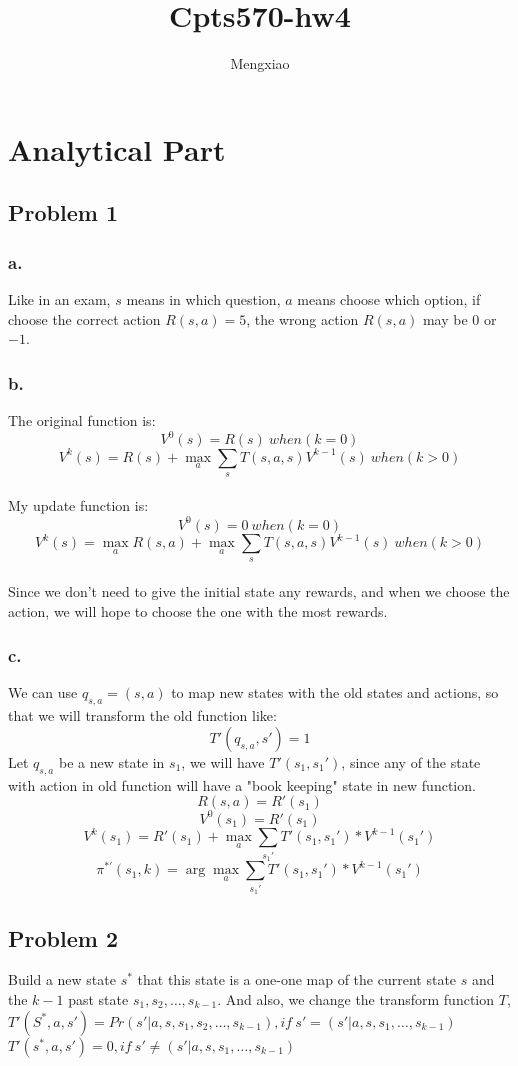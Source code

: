 \documentclass[12pt]{article}
\author{Mengxiao}
\title{Cpts570-hw4}
\begin{document}
	\maketitle
	\pagebreak
	\section{Analytical Part}
		\subsection{Problem 1}
            \subsubsection{a.}
                Like in an exam, $s$ means in which question, $a$ means choose which option,
                if choose the correct action $R(s,a)=5$, the wrong action $R(s,a)$ may be $0$ or $-1$.
            \subsubsection{b.}
                The original function is:
                    $$V^0(s)=R(s)\ when(k=0)$$
                    $$V^k(s)=R(s)+\max_a\sum_sT(s,a,s)V^{k-1}(s)\ when(k>0)$$\\
                My update function is:
                    $$V^0(s)=0\ when(k=0)$$
                    $$V^k(s)=\max_aR(s,a)+\max_a\sum_sT(s,a,s)V^{k-1}(s)\ when (k>0)$$\\
                Since we don't need to give the initial state any rewards, and when we choose the
                action, we will hope to choose the one with the most rewards.
            \subsubsection{c.}
                We can use $q_{s,a}=(s,a)$ to map new states with the old states and actions, so that
                we will transform the old function like:
                    $$T'(q_{s,a},s')=1$$ 
                Let $q_{s,a}$ be a new state in $s_1$, we will have $T'(s_1,s_1')$, since any of the
                state with action in old function will have a "book keeping" state in new function.
                $$R(s,a)=R'(s_1)$$
                $$V^0(s_1)=R'(s_1)$$
                $$V^k(s_1)=R'(s_1)+\max_a\sum_{s_1'}T'(s_1,s_1')*V^{k-1}(s_1')$$
                $$\pi^{*'}(s_1,k)=\arg\max_a\sum_{s_1'}T'(s_1,s_1')*V^{k-1}(s_1')$$
        \subsection{Problem 2}
            Build a new state $s^*$ that this state is a one-one map of the current state $s$ and the
            $k-1$ past state $s_1,s_2,\ldots,s_{k-1}$. And also, we change the transform function
            $T$,\\
            $T'(S^*,a,s')=Pr(s'|a,s,s_1,s_2,\ldots,s_{k-1}),if\ s'=(s'|a,s,s_1,\ldots,s_{k-1})$\\
            $T'(s^*,a,s')=0,if\ s'\neq(s'|a,s,s_1,\ldots,s_{k-1})$
\end{document}

